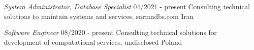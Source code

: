 \documentclass[a4paper,12pt]{memoir} %
\begin{document}

\Sep %




{\textit{System Administrator, Database Specialist}}
{04/2021 - present}
{Consulting technical solutions to maintain systems and services.}
{sarmadbs.com}
{Iran}


{\textit{Software Engineer}}
{08/2020 - present}
{Consulting technical solutions for development of computational services.}
{undisclosed}
{Poland}


\Sep %






\Sep %


\clearpage %

\userinformation %
\end{document}

